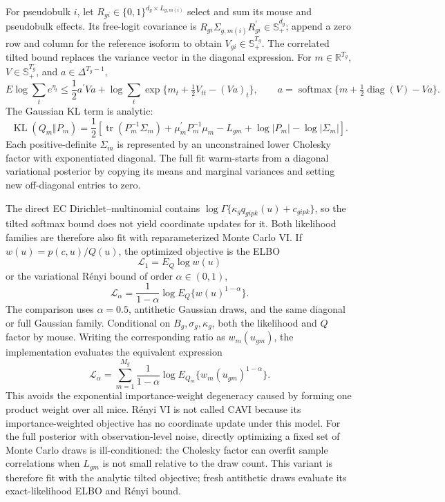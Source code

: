 \documentclass[11pt]{article}
\begin{document}
For pseudobulk \(i\), let \(R_{gi}\in\{0,1\}^{d_g\times L_{g,m(i)}}\) select and sum its mouse and pseudobulk effects. Its free-logit covariance is $R_{gi}\Sigma_{g,m(i)}R_{gi}^\prime\in\mathbb S_+^{d_g}$; append a zero row and column for the reference isoform to obtain $V_{gi}\in\mathbb S_+^{T_g}$. The correlated tilted bound replaces the variance vector in the diagonal expression. For $m\in\mathbb R^{T_g}$, $V\in\mathbb S_+^{T_g}$, and $a\in\Delta^{T_g-1}$, \[
 E\log\sum_t e^{\eta_t}
 \leq \frac12a^\prime Va
 +\log\sum_t\exp\{m_t+\tfrac12V_{tt}-(Va)_t\},
 \qquad
 a=\operatorname{softmax}\{m+\tfrac12\operatorname{diag}(V)-Va\}.
\]
The Gaussian KL term is analytic: \[
 \operatorname{KL}(Q_m\Vert P_m)=\frac12\left[
 \operatorname{tr}(P_m^{-1}\Sigma_m)
 +\mu_m^\prime P_m^{-1}\mu_m-L_{gm}
 +\log|P_m|-\log|\Sigma_m|\right].
\]
Each positive-definite $\Sigma_m$ is represented by an unconstrained lower Cholesky factor with exponentiated diagonal. The full fit warm-starts from a diagonal variational posterior by copying its means and marginal variances and setting new off-diagonal entries to zero.

The direct EC Dirichlet--multinomial contains \(\log\Gamma\{\kappa_gq_{gipk}(u)+c_{gipk}\}\), so the tilted softmax bound does not yield coordinate updates for it. Both likelihood families are therefore also fit with reparameterized Monte Carlo VI. If \(w(u)=p(c,u)/Q(u)\), the optimized objective is the ELBO \[
 \mathcal L_1=E_Q\log w(u)
\]
or the variational R\'enyi bound of order \(\alpha\in(0,1)\), \[
 \mathcal L_\alpha=
 \frac{1}{1-\alpha}\log E_Q\{w(u)^{1-\alpha}\}.
\]
The comparison uses \(\alpha=0.5\), antithetic Gaussian draws, and the same diagonal or full Gaussian family. Conditional on \(B_g,\sigma_g,\kappa_g\), both the likelihood and \(Q\) factor by mouse. Writing the corresponding ratio as \(w_m(u_{gm})\), the implementation evaluates the equivalent expression \[
 \mathcal L_\alpha=
 \sum_{m=1}^{M_g}\frac{1}{1-\alpha}
 \log E_{Q_m}\{w_m(u_{gm})^{1-\alpha}\}.
\]
This avoids the exponential importance-weight degeneracy caused by forming one product weight over all mice. R\'enyi VI is not called CAVI because its importance-weighted objective has no coordinate update under this model. For the full posterior with observation-level noise, directly optimizing a fixed set of Monte Carlo draws is ill-conditioned: the Cholesky factor can overfit sample correlations when $L_{gm}$ is not small relative to the draw count. This variant is therefore fit with the analytic tilted objective; fresh antithetic draws evaluate its exact-likelihood ELBO and R\'enyi bound.
\end{document}
